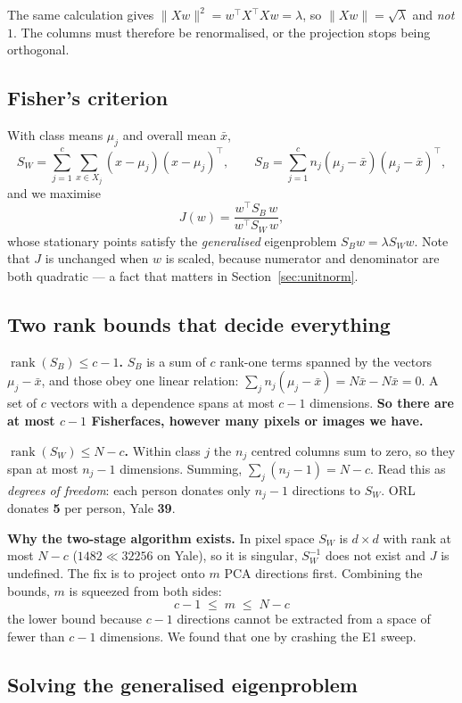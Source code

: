 \documentclass[11pt]{article}
\theoremstyle{remark}
\newcommand{\Sw}{S_W}
\newcommand{\Sb}{S_B}
\newcommand{\rank}{\operatorname{rank}}
\begin{document}
The same calculation gives
$\|Xw\|^2 = w^{\!\top}X^{\!\top}\!Xw = \lambda$, so $\|Xw\| = \sqrt{\lambda}$
and \emph{not} $1$. The columns must therefore be renormalised, or the
projection stops being orthogonal.

\subsection{Fisher's criterion}

With class means $\mu_j$ and overall mean $\bar{x}$,
\[
  \Sw=\sum_{j=1}^{c}\sum_{x\in X_j}(x-\mu_j)(x-\mu_j)^{\!\top},
  \qquad
  \Sb=\sum_{j=1}^{c}n_j(\mu_j-\bar{x})(\mu_j-\bar{x})^{\!\top},
\]
and we maximise
\[
  J(w)=\frac{w^{\!\top}\Sb\,w}{w^{\!\top}\Sw\,w},
\]
whose stationary points satisfy the \emph{generalised} eigenproblem
$\Sb w=\lambda\Sw w$. Note that $J$ is unchanged when $w$ is scaled, because
numerator and denominator are both quadratic --- a fact that matters in
Section~\ref{sec:unitnorm}.

\subsection{Two rank bounds that decide everything}

\textbf{$\rank(\Sb)\le c-1$.} $\Sb$ is a sum of $c$ rank-one terms spanned by
the vectors $\mu_j-\bar{x}$, and those obey one linear relation:
$\sum_j n_j(\mu_j-\bar{x}) = N\bar{x}-N\bar{x} = 0$. A set of $c$ vectors with
a dependence spans at most $c-1$ dimensions. \textbf{So there are at most $c-1$
Fisherfaces, however many pixels or images we have.}

\textbf{$\rank(\Sw)\le N-c$.} Within class $j$ the $n_j$ centred columns sum to
zero, so they span at most $n_j-1$ dimensions. Summing,
$\sum_j(n_j-1)=N-c$. Read this as \emph{degrees of freedom}: each person
donates only $n_j-1$ directions to $\Sw$. ORL donates \textbf{5} per person,
Yale \textbf{39}.

\textbf{Why the two-stage algorithm exists.} In pixel space $\Sw$ is $d\times d$
with rank at most $N-c$ ($1482 \ll 32256$ on Yale), so it is singular, $\Sw^{-1}$
does not exist and $J$ is undefined. The fix is to project onto $m$ PCA
directions first. Combining the bounds, $m$ is squeezed from both sides:
\[
  \boxed{\;c-1 \;\le\; m \;\le\; N-c\;}
\]
the lower bound because $c-1$ directions cannot be extracted from a space of
fewer than $c-1$ dimensions. We found that one by crashing the E1 sweep.

\subsection{Solving the generalised eigenproblem}
\end{document}
